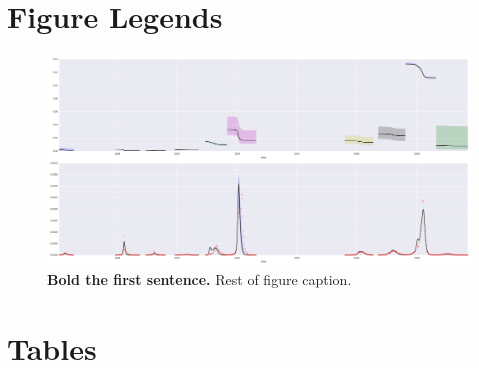 \section*{Figure Legends}
%
\begin{figure}
\begin{center}
\includegraphics[width=.9\textwidth]{./plots/concat_SI.png}
\end{center}
\caption{
{\bf Bold the first sentence.}  Rest of figure caption.  
}
\label{Fig:S0}
\end{figure}





\section*{Tables}
% 
%
%


